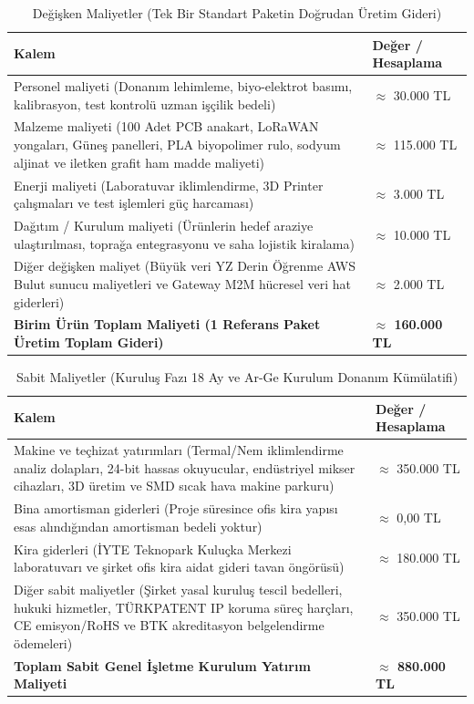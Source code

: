 \documentclass[11pt,a4paper]{article}
\begin{document}
\begin{table}[h]
\centering
\caption{Değişken Maliyetler (Tek Bir Standart Paketin Doğrudan Üretim Gideri)}
\begin{tabular}{p{9.5cm}p{4.5cm}}
\toprule
\textbf{Kalem} & \textbf{Değer / Hesaplama}\\
\midrule
Personel maliyeti (Donanım lehimleme, biyo-elektrot basımı, kalibrasyon, test kontrolü uzman işçilik bedeli) & $\approx$ 30.000 TL\\
Malzeme maliyeti (100 Adet PCB anakart, LoRaWAN yongaları, Güneş panelleri, PLA biyopolimer rulo, sodyum aljinat ve iletken grafit ham madde maliyeti) & $\approx$ 115.000 TL\\
Enerji maliyeti (Laboratuvar iklimlendirme, 3D Printer çalışmaları ve test işlemleri güç harcaması) & $\approx$ 3.000 TL\\
Dağıtım / Kurulum maliyeti (Ürünlerin hedef araziye ulaştırılması, toprağa entegrasyonu ve saha lojistik kiralama) & $\approx$ 10.000 TL\\
Diğer değişken maliyet (Büyük veri YZ Derin Öğrenme AWS Bulut sunucu maliyetleri ve Gateway M2M hücresel veri hat giderleri) & $\approx$ 2.000 TL\\
\midrule
\textbf{Birim Ürün Toplam Maliyeti (1 Referans Paket Üretim Toplam Gideri)} & \textbf{$\approx$ 160.000 TL}\\
\bottomrule
\end{tabular}
\end{table}

\begin{table}[h]
\centering
\caption{Sabit Maliyetler (Kuruluş Fazı 18 Ay ve Ar-Ge Kurulum Donanım Kümülatifi)}
\begin{tabular}{p{9.5cm}p{4.5cm}}
\toprule
\textbf{Kalem} & \textbf{Değer / Hesaplama}\\
\midrule
Makine ve teçhizat yatırımları (Termal/Nem iklimlendirme analiz dolapları, 24-bit hassas okuyucular, endüstriyel mikser cihazları, 3D üretim ve SMD sıcak hava makine parkuru) & $\approx$ 350.000 TL\\
Bina amortisman giderleri (Proje süresince ofis kira yapısı esas alındığından amortisman bedeli yoktur) & $\approx$ 0,00 TL\\
Kira giderleri (İYTE Teknopark Kuluçka Merkezi laboratuvarı ve şirket ofis kira aidat gideri tavan öngörüsü) & $\approx$ 180.000 TL\\
Diğer sabit maliyetler (Şirket yasal kuruluş tescil bedelleri, hukuki hizmetler, TÜRKPATENT IP koruma süreç harçları, CE emisyon/RoHS ve BTK akreditasyon belgelendirme ödemeleri) & $\approx$ 350.000 TL\\
\midrule
\textbf{Toplam Sabit Genel İşletme Kurulum Yatırım Maliyeti} & \textbf{$\approx$ 880.000 TL}\\
\bottomrule
\end{tabular}
\end{table}
\end{document}
